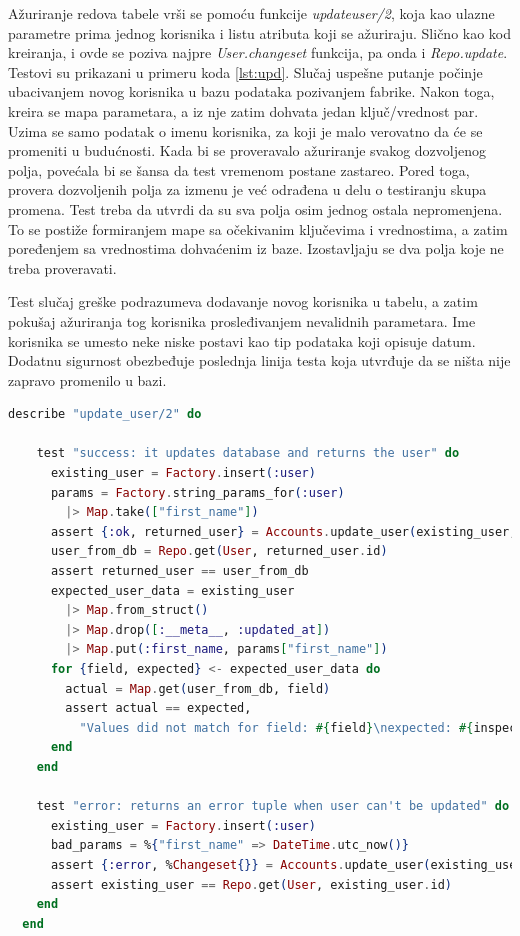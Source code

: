 \documentclass[12pt,oneside]{memoir}
\begin{document}
\par Ažuriranje redova tabele vrši se pomoću funkcije \emph{update{\textunderscore}user/2}, koja kao ulazne parametre prima jednog korisnika i listu atributa koji se ažuriraju. Slično kao kod kreiranja, i ovde se poziva najpre \emph{User.changeset} funkcija, pa onda i \emph{Repo.update}. Testovi su prikazani u primeru koda \ref{lst:upd}. Slučaj uspešne putanje počinje ubacivanjem novog korisnika u bazu podataka pozivanjem fabrike. Nakon toga, kreira se mapa parametara, a iz nje zatim dohvata jedan ključ/vrednost par. Uzima se samo podatak o imenu korisnika, za koji je malo verovatno da će se promeniti u budućnosti. Kada bi se proveravalo ažuriranje svakog dozvoljenog polja, povećala bi se šansa da test vremenom postane zastareo. Pored toga, provera dozvoljenih polja za izmenu je već odrađena u delu o testiranju skupa promena. Test treba da utvrdi da su sva polja osim jednog ostala nepromenjena. To se postiže formiranjem mape sa očekivanim ključevima i vrednostima, a zatim poređenjem sa vrednostima dohvaćenim iz baze. Izostavljaju se dva polja koje ne treba proveravati. 
\par Test slučaj greške podrazumeva dodavanje novog korisnika u tabelu, a zatim pokušaj ažuriranja tog korisnika prosleđivanjem nevalidnih parametara. Ime korisnika se umesto neke niske postavi kao tip podataka koji opisuje datum. Dodatnu sigurnost obezbeđuje poslednja linija testa koja utvrđuje da se ništa nije zapravo promenilo u bazi.

\begin{lstlisting}[language=elixir, caption={Testiranje funkcije \emph{update{\textunderscore}user/2}},captionpos=b, label={lst:upd}]
describe "update_user/2" do

    test "success: it updates database and returns the user" do
      existing_user = Factory.insert(:user)
      params = Factory.string_params_for(:user)
        |> Map.take(["first_name"])
      assert {:ok, returned_user} = Accounts.update_user(existing_user, params)
      user_from_db = Repo.get(User, returned_user.id)
      assert returned_user == user_from_db
      expected_user_data = existing_user
        |> Map.from_struct()
        |> Map.drop([:__meta__, :updated_at])
        |> Map.put(:first_name, params["first_name"])
      for {field, expected} <- expected_user_data do
        actual = Map.get(user_from_db, field)
        assert actual == expected,
          "Values did not match for field: #{field}\nexpected: #{inspect(expected)}\nactual: #{inspect(actual)}"
      end
    end

    test "error: returns an error tuple when user can't be updated" do
      existing_user = Factory.insert(:user)
      bad_params = %{"first_name" => DateTime.utc_now()}
      assert {:error, %Changeset{}} = Accounts.update_user(existing_user, bad_params)
      assert existing_user == Repo.get(User, existing_user.id)
    end
  end
\end{lstlisting}
\end{document}
